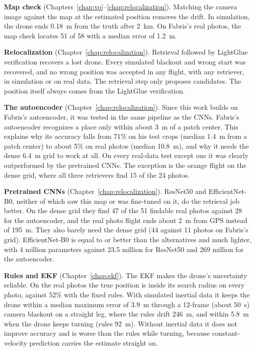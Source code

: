 \documentclass[english, Lau, oneside]{sapthesis}%
\begin{document}
\textbf{Map check} (Chapters~\ref{chap:vo}--\ref{chap:relocalization}). Matching the camera image against the map at the estimated position removes the drift. In simulation, the drone ends 0.18~m from the truth after 2~km. On Fabris's real photos, the map check locates 51 of 58 with a median error of 1.2~m.

\textbf{Relocalization} (Chapter~\ref{chap:relocalization}). Retrieval followed by LightGlue verification recovers a lost drone. Every simulated blackout and wrong start was recovered, and no wrong position was accepted in any flight, with any retriever, in simulation or on real data. The retrieval step only proposes candidates. The position itself always comes from the LightGlue verification.

\textbf{The autoencoder} (Chapter~\ref{chap:relocalization}). Since this work builds on Fabris's autoencoder, it was tested in the same pipeline as the CNNs. Fabris's autoencoder recognizes a place only within about 3~m of a patch center. This explains why its accuracy falls from 71\% on his test crops (median 1.4~m from a patch center) to about 5\% on real photos (median 10.8~m), and why it needs the dense 6.4~m grid to work at all. On every real-data test except one it was clearly outperformed by the pretrained CNNs. The exception is the orange flight on the dense grid, where all three retrievers find 15 of the 24 photos.

\textbf{Pretrained CNNs} (Chapter~\ref{chap:relocalization}). ResNet50 and EfficientNet-B0, neither of which saw this map or was fine-tuned on it, do the retrieval job better. On the dense grid they find 47 of the 51 findable real photos against 28 for the autoencoder, and the real photo flight ends about 2~m from GPS instead of 195~m. They also barely need the dense grid (44 against 11 photos on Fabris's grid). EfficientNet-B0 is equal to or better than the alternatives and much lighter, with 4 million parameters against 23.5 million for ResNet50 and 269 million for the autoencoder.

\textbf{Rules and EKF} (Chapter~\ref{chap:ekf}). The EKF makes the drone's uncertainty reliable. On the real photos the true position is inside its search radius on every photo, against 52\% with the fixed rules. With simulated inertial data it keeps the drone within a median maximum error of 3.9~m through a 12-frame (about 50~s) camera blackout on a straight leg, where the rules drift 246~m, and within 5.8~m when the drone keeps turning (rules 92~m). Without inertial data it does not improve accuracy and is worse than the rules while turning, because constant-velocity prediction carries the estimate straight on.
\end{document}
